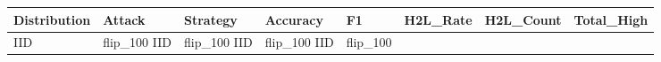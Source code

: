 \begin{tabular}{llllllrr}
\toprule
Distribution & Attack & Strategy & Accuracy & F1 & H2L_Rate & H2L_Count & Total_High \\
\midrule
IID & flip_100%
IID & flip_100%
IID & flip_100%
IID & flip_100%
\bottomrule
\end{tabular}
